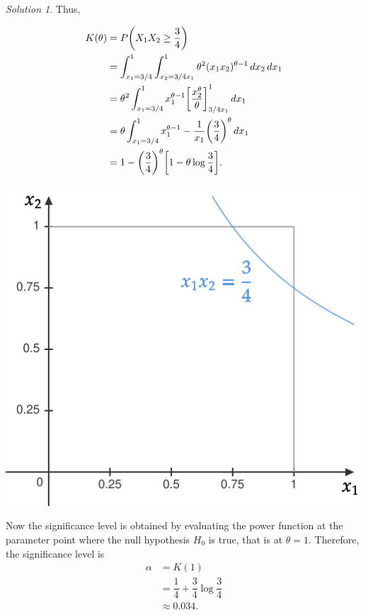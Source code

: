 \documentclass[svgnames, a5paper]{article}
\theoremstyle{definition}
\theoremstyle{remark}
\newtheorem*{Solution*}{Solution}
\begin{document}
\begin{enumerate}
\begin{Solution*}
Thus,\\
\begin{minipage}[h]{0.5\linewidth}
\begin{align*}
K(\theta) & = P\pqty{ X_1 X_2 \ge \frac 3 4 } \\
	&= \int_{x_1 = 3/4}^1 \int_{x_2 = 3/4x_1}^1 \theta^2 (x_1 x_2)^{\theta - 1} \,dx_2 \,dx_1\\
	&= \theta^2 \int_{x_1 = 3/4}^1 x_1^{\theta - 1} \bqty{\dfrac{x_2^\theta}{\theta}}_{3/4x_1}^1 \,dx_1\\
	&= \theta \int_{x_1 = 3/4}^1 x_1^{\theta - 1} - \dfrac 1 {x_1} \pqty{\dfrac 3 4}^\theta \,dx_1\\
	&= 1 - \pqty{\dfrac 3 4}^\theta \bqty{1 - \theta \log \dfrac 3 4 }.
\end{align*}
\end{minipage}\quad
\begin{minipage}{0.4\linewidth}
\includegraphics[width=0.9\linewidth]{RectangularHyperbola.pdf}
\end{minipage}

Now the significance level is obtained by evaluating the power function at the parameter point where the null hypothesis $H_0$ is true, that is at $\theta = 1$. Therefore, the significance level is
\begin{align*}
\alpha &= K(1) \\
& = \dfrac 1 4 + \dfrac 3 4 \log \dfrac 3 4 \\
& \approx 0.034.
\end{align*}
\end{Solution*}


\end{enumerate}
\end{document}
